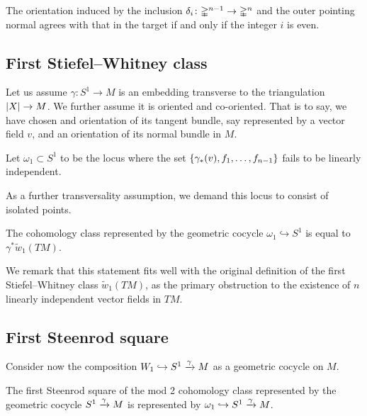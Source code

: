 \begin{lemma}
	The orientation induced by the inclusion $\delta_i \colon \mathbb{\Delta}^{n-1} \to \mathbb{\Delta}^n$ and the outer pointing normal agrees with that in the target if and only if the integer $i$ is even.
\end{lemma}

\subsection*{First Stiefel--Whitney class}

Let us assume $\gamma \colon S^1 \to M$ is an embedding transverse to the triangulation $\lvert X\rvert \to M$.
We further assume it is oriented and co-oriented.
That is to say, we have chosen and orientation of its tangent bundle, say represented by a vector field $v$, and an orientation of its normal bundle in $M$.

\begin{definition}
	Let $\omega_1 \subset S^1$ to be the locus where the set $\{\gamma_\ast (v), f_1, \dots, f_{n-1}\}$ fails to be linearly independent.
\end{definition}

As a further transversality assumption, we demand this locus to consist of isolated points.

\begin{proposition}
	The cohomology class represented by the geometric cocycle $\omega_1 \hookrightarrow S^1$ is equal to $\gamma^\ast \widetilde w_1(TM)$.
\end{proposition}

We remark that this statement fits well with the original definition of the first Stiefel--Whitney class $\widetilde w_1(TM)$, as the primary obstruction to the existence of $n$ linearly independent vector fields in $TM$.


\subsection*{First Steenrod square}

Consider now the composition $W_1 \hookrightarrow S^1 \xrightarrow{\gamma} M$ as a geometric cocycle on $M$.

\begin{proposition}
	The first Steenrod square of the mod 2 cohomology class represented by the geometric cocycle $S^1 \xrightarrow{\gamma} M$ is represented by $\omega_1 \hookrightarrow S^1 \xrightarrow{\gamma} M$.
\end{proposition}

